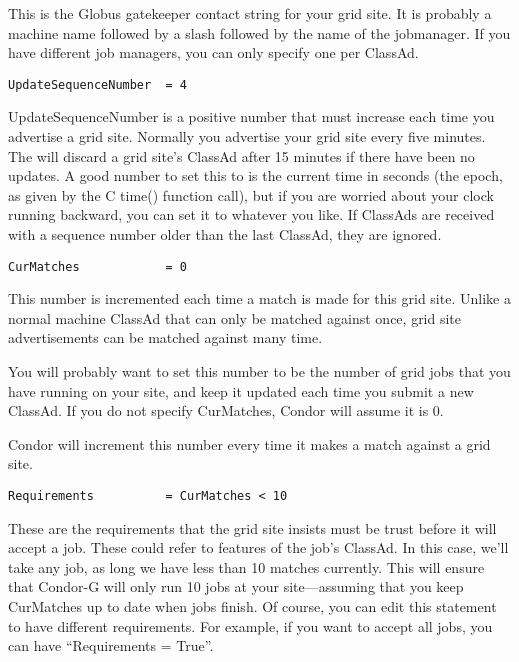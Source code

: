 This is the Globus gatekeeper contact string for your grid site. It is
probably a machine name followed by a slash followed by the name of
the jobmanager. If you have different job managers, you can only
specify one per ClassAd. 

\begin{verbatim}
UpdateSequenceNumber  = 4
\end{verbatim}

UpdateSequenceNumber is a positive number that must increase each time
you advertise a grid site. Normally you advertise your grid site
every five minutes. The  will discard a grid site's
ClassAd after 15 minutes if there have been no updates. A good number
to set this to is the current time in seconds (the epoch, as given by
the C time() function call), but if you are worried about your clock
running backward, you can set it to whatever you like. If ClassAds are
received with a sequence number older than the last ClassAd, they are
ignored. 

\begin{verbatim}
CurMatches            = 0
\end{verbatim}

This number is incremented each time a match is made for this grid
site. Unlike a normal machine ClassAd that can only be matched against
once, grid site advertisements can be matched against many time. 

You will probably want to set this number to be the number of grid
jobs that you have running on your site, and keep it updated each time
you submit a new ClassAd. If you do not specify CurMatches, Condor
will assume it is 0.

Condor will increment this number every time it makes a match against
a grid site.

\begin{verbatim}
Requirements          = CurMatches < 10
\end{verbatim}

These are the requirements that the grid site insists must be trust
before it will accept a job. These could refer to features of the
job's ClassAd. In this case, we'll take any job, as long we have less
than 10 matches currently. This will ensure that Condor-G will only
run 10 jobs at your site---assuming that you keep CurMatches up to
date when jobs finish. Of course, you can edit this statement to have
different requirements. For example, if you want to accept all jobs,
you can have ``Requirements = True''. 

